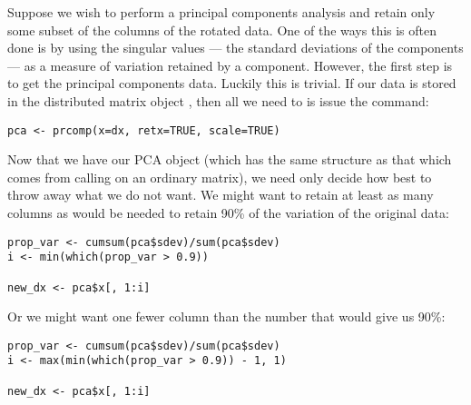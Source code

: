Suppose we wish to perform a principal components analysis and retain only some subset of the columns of the rotated data.  One of the ways this is often done is by using the singular values --- the standard deviations of the components --- as a measure of variation retained by a component.  However, the first step is to get the principal components data.  Luckily this is trivial.  If our data is stored in the distributed matrix object , then all we need to is issue the command:
\begin{lstlisting}[language=rr]
pca <- prcomp(x=dx, retx=TRUE, scale=TRUE)
\end{lstlisting}

Now that we have our PCA object (which has the same structure as that which comes from calling  on an ordinary  matrix), we need only decide how best to throw away what we do not want.  We might want to retain at least as many columns as would be needed to retain 90\% of the variation of the original data:

\begin{lstlisting}[language=rr]
prop_var <- cumsum(pca$sdev)/sum(pca$sdev)
i <- min(which(prop_var > 0.9))

new_dx <- pca$x[, 1:i]
\end{lstlisting}

Or we might want one fewer column than the number that would give us 90\%:

\begin{lstlisting}[language=rr]
prop_var <- cumsum(pca$sdev)/sum(pca$sdev)
i <- max(min(which(prop_var > 0.9)) - 1, 1)

new_dx <- pca$x[, 1:i]
\end{lstlisting}

